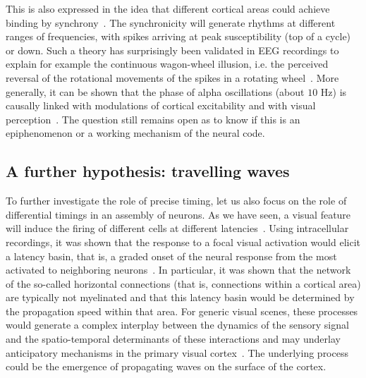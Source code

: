 \documentclass[brainsci, %
               review,submit,pdftex,moreauthors
               ]{Definitions/mdpi}
\begin{document}
This is also expressed in the idea that different cortical areas could achieve binding by synchrony~\citep{fries_mechanism_2005}. The synchronicity will generate rhythms at different ranges of frequencies, with spikes arriving at peak susceptibility (top of a cycle) or down. Such a theory has surprisingly been validated in EEG recordings to explain for example the continuous wagon-wheel illusion, i.e. the perceived reversal of the rotational movements of the spikes in a rotating wheel~\citep{vanrullen_continuous_2006}. More generally, it can be shown that the phase of alpha oscillations (about $10$ Hz) is causally linked with modulations of cortical excitability and with visual perception~\citep{dugue_phase_2011}. The question still remains open as to know if this is an epiphenomenon or a working mechanism of the neural code.
%
\subsection{A further hypothesis: travelling waves}
%
To further investigate the role of precise timing, let us also focus on the role of differential timings in an assembly of neurons. As we have seen, a visual feature will induce the firing of different cells at different latencies~\citep{celebrini_dynamics_1993}. Using intracellular recordings, it was shown that the response to a focal visual activation would elicit a latency basin, that is, a graded onset of the neural response from the most activated to neighboring neurons~\citep{bringuier_horizontal_1999}. In particular, it was shown that the network of the so-called horizontal connections (that is, connections within a cortical area) are typically not myelinated and that this latency basin would be determined by the propagation speed within that area. For generic visual scenes, these processes would generate a complex interplay between the dynamics of the sensory signal and the spatio-temporal determinants of these interactions and may underlay anticipatory mechanisms in the primary visual cortex~\citep{benvenuti_anticipatory_2020,le_bec_horizontal_2022}. The underlying process could be the emergence of propagating waves on the surface of the cortex.
\end{document}
